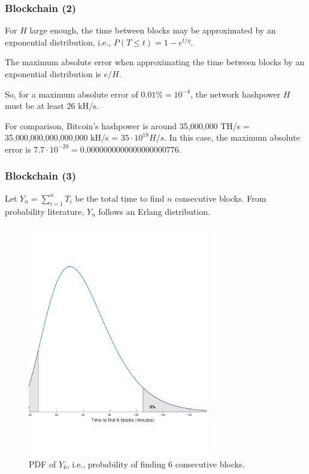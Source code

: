 \documentclass{beamer}
\begin{document}
\begin{frame}
\frametitle{Blockchain (2)}

\begin{theorem}
    For $H$ large enough, the time between blocks may be approximated by an exponential distribution, i.e., $P(T \le t) = 1 - e^{t/\eta}$.
\end{theorem}

\begin{theorem}
	The maximum absolute error when approximating the time between blocks by an exponential distribution is $e / H$.
\end{theorem}

So, for a maximum absolute error of $0.01 \% = 10^{-4}$, the network hashpower $H$ must be at least 26 kH/s.

For comparison, Bitcoin's hashpower is around 35,000,000 TH/s = 35,000,000,000,000,000 kH/s = $35 \cdot 10^{18} H/s$. In this case, the maximum absolute error is $7.7 \cdot 10^{-20} = 0.0000000000000000000776$.

\end{frame}


\begin{frame}
\frametitle{Blockchain (3)}

Let $Y_n = \sum_{i=1}^n T_i$ be the total time to find $n$ consecutive blocks. From probability literature, $Y_n$ follows an Erlang distribution.

\begin{figure}
\includegraphics[width=0.7\textwidth]{./images01/time-6-blocks.pdf}
\caption{PDF of $Y_6$, i.e., probability of finding 6 consecutive blocks.}
\end{figure}

\end{frame}
\end{document}

